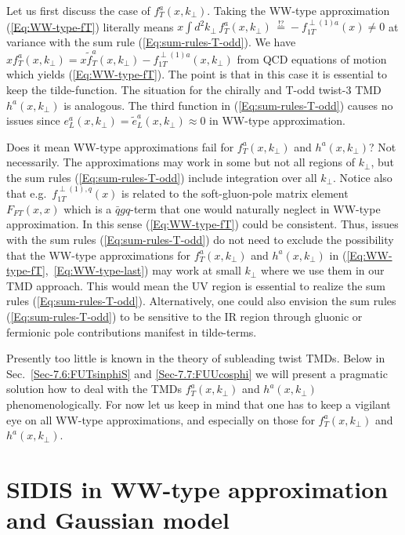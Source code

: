 \documentclass[a4paper,11pt]{article}
\newcommand{\darkgreen}[1]{{\color{darkgreen} #1}}
\newcommand{\ms}[1]{\darkgreen{ #1}}
\def\kperp{k_\perp}
\begin{document}
Let us first discuss the case of $f_T^a(x,k_\perp)$. Taking the  
WW-type approximation (\ref{Eq:WW-type-fT}) literally means
$x\int d^2 k_\perp\,f_T^a(x,k_\perp)\,\stackrel{!?}{=}
-f_{1T}^{\perp(1)a}(x)\neq0$ 
at variance with the sum rule (\ref{Eq:sum-rules-T-odd}). We 
have $xf_T^a(x,k_\perp)=x\tilde{f}_T^a(x,k_\perp)-f_{1T}^{\perp(1)a}(x,k_\perp)$ 
from QCD equations of motion \cite{Bacchetta:2006tn} which yields
(\ref{Eq:WW-type-fT}). The point is that in this case it is 
essential to keep the tilde-function. 
The situation for the chirally and T-odd twist-3 
TMD $h^a(x,k_\perp)$ is analogous. The third 
function in (\ref{Eq:sum-rules-T-odd}) causes no issues since 
$e_L^a(x,k_\perp)=\tilde{e}_L^a(x,k_\perp)\approx0$ in WW-type approximation.

Does it mean WW-type approximations fail for $f_T^a(x,k_\perp)$ 
and $h^a(x,k_\perp)$? Not necessarily. \ms{The approximations may
work in some but not all regions of $\kperp$, but the sum rules 
(\ref{Eq:sum-rules-T-odd}) include integration over all $k_\perp$. 
Notice also that e.g.\ $f_{1T}^{\perp (1),q}(x)$ is related to the 
soft-gluon-pole matrix element $F_{FT}(x,x)$ \cite{Boer:2003cm,Ji:2006ub}
which is a $\bar{q}gq$-term that one would naturally neglect 
in WW-type approximation.
In this sense (\ref{Eq:WW-type-fT}) could be consistent.}
Thus, issues with the sum rules 
(\ref{Eq:sum-rules-T-odd}) do not need to exclude the
possibility that the WW-type approximations for $f_T^a(x,k_\perp)$ and
$h^a(x,k_\perp)$ in (\ref{Eq:WW-type-fT},~\ref{Eq:WW-type-last}) 
may work at small $k_\perp$ where we use them in our TMD approach.
This would mean the UV region is essential to realize the sum rules 
(\ref{Eq:sum-rules-T-odd}). Alternatively, one could also envision 
the sum rules (\ref{Eq:sum-rules-T-odd}) to be sensitive to the
IR region through gluonic or fermionic pole contributions manifest
in tilde-terms. 

Presently too little is known in the theory of subleading twist TMDs. 
Below in Sec.~\ref{Sec-7.6:FUTsinphiS} and \ref{Sec-7.7:FUUcosphi} we 
will present a pragmatic solution how to deal with the TMDs 
$f_T^a(x,k_\perp)$ and $h^a(x,k_\perp)$ phenomenologically. 
For now let us keep in mind that 
one has to keep a vigilant eye on all WW-type approximations, and 
especially on those for $f_T^a(x,k_\perp)$ and $h^a(x,k_\perp)$.



\section{SIDIS in WW-type approximation and Gaussian model}
\label{Sec-4:SIDIS-in-WW-approximation}
\end{document}
